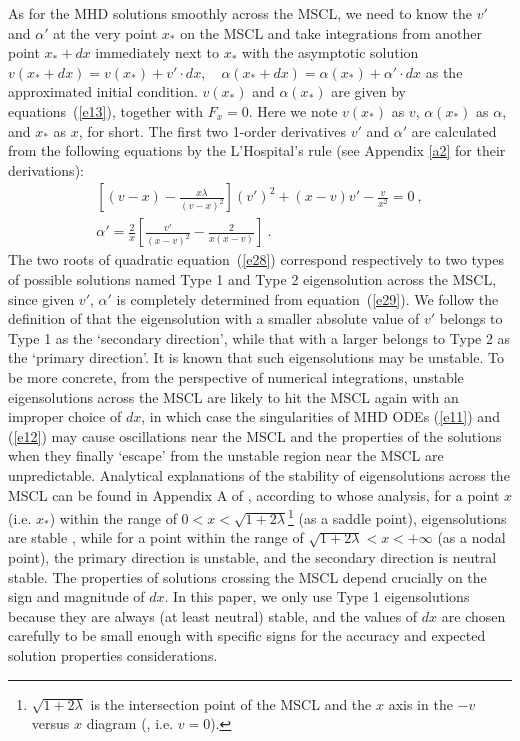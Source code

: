 \documentclass[fleqn,usenatbib]{mnras}
\begin{document}
As for the MHD solutions smoothly across the MSCL, we need to know the $v'$ and $\alpha'$ at the very point $x_{*}$ on the MSCL and take integrations from another point $x_{*}+dx$ immediately next to $x_{*}$ with the asymptotic solution $v(x_{*}+dx)=v(x_{*})+v'\cdot dx, \quad \alpha(x_{*}+dx)=\alpha(x_{*})+\alpha'\cdot dx$ as the approximated initial condition. $v(x_{*})$ and $\alpha(x_{*})$ are given by equations~(\ref{e13}), together with $F_x=0$. Here we note $v(x_{*})$ as $v$, $\alpha(x_{*})$ as $\alpha$, and $x_{*}$ as $x$, for short. The first two 1-order derivatives $v'$ and $\alpha'$ are calculated from the following equations by the L'Hospital's rule (see Appendix \ref{a2} for their derivations):
\begin{gather}
\left[ (v-x)-\frac{x\lambda}{(v-x)^{2}}\right]\left(v'\right)^{2}
 +(x-v)v'-\frac{v}{x^{2}}=0\ ,\label{e28}\\
\alpha'=\frac{2}{x}\left[\frac{v'}
 {(x-v)^{2}}-\frac{2}{x(x-v)}\right]\ .\label{e29}
\end{gather}
The two roots of quadratic equation~(\ref{e28}) correspond respectively to two types of possible solutions named Type 1 and Type 2 eigensolution across the MSCL, since given $v'$, $\alpha'$ is completely determined from equation~(\ref{e29}). We follow the definition of \citet{yuLou2006} that the eigensolution with a smaller absolute value of $v'$ belongs to Type 1 as the `secondary direction', while that with a larger belongs to Type 2 as the `primary direction'. It is known that such eigensolutions may be unstable. %
To be more concrete, from the perspective of numerical integrations, unstable eigensolutions across the MSCL are likely to hit the MSCL again with an improper choice of $dx$, in which case the singularities of MHD ODEs (\ref{e11}) and (\ref{e12}) may cause oscillations near the MSCL and the properties of the solutions when they finally `escape' from the unstable region near the MSCL are unpredictable. Analytical explanations of the stability of eigensolutions across the MSCL can be found in Appendix A of \citet{yuLou2005}, according to whose analysis, for a point $x$ (i.e. $x_{*}$) within the range of $0<x<\sqrt{1+2\lambda}$\footnote{$\sqrt{1+2\lambda}$ is the intersection point of the MSCL and the $x$ axis in the $-v$ versus $x$ diagram (, i.e. $v=0$).} (as a saddle point), eigensolutions are stable%
, while for a point within the range of $\sqrt{1+2\lambda}<x<+\infty$ (as a nodal point), the primary direction is unstable, and the secondary direction is neutral stable. The properties of solutions crossing the MSCL depend crucially on the sign and magnitude of $dx$. In this paper, we only use Type 1 eigensolutions because they are always (at least neutral) stable, and the values of $dx$ are chosen carefully to be small enough with specific signs for the accuracy and expected solution properties considerations. 
\end{document}
